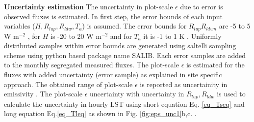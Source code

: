 \documentclass[fleqn,10pt]{wlscirep}
\begin{document}
{%

  

\textbf{Uncertainty estimation}
The uncertainty in plot-scale $\epsilon$ due to error is observed fluxes is estimated. In first step, the error bounds of each input variables ($ H, R_{lup}, R_{ldw}, T_{a}$) is assumed. The error bounds for $R_{lup}  R_{ldwn}$ are -5 to 5 W m$^{-2}$ \cite{trenberth2012tracking}, for $H$ is -20 to 20 W m$^{-2}$ and for $T_{a}$ it is -1 to 1 K \cite{foken2008energy}. Uniformly distributed samples within error bounds are generated using saltelli sampling scheme\cite{saltelli2017new} using python based package name SALIB. Each error samples are added to the  monthly segregated measured fluxes. The plot-scale $\epsilon$ is estimated for the fluxes with added uncertainty (error sample) as explained in site specific approach. The obtained range of plot-scale $\epsilon$ is reported as uncertainity in emissivity . The plot-scale $\epsilon$ uncertainty  with uncertainty in $R_{lup}, R_{ldw}$ is used to calculate the uncertainty in hourly LST using short equation Eq. \ref{eq_Tseq} and long equation Eq.\ref{eq_Tleq} as shown in Fig. \ref{fig:eps_unc1}b,c. 
. 
 
}
\end{document}
